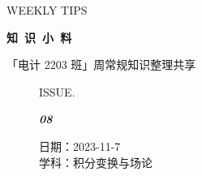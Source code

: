 \documentclass[UTF8]{ctexart}
\newcommand\Black[1]{\textcolor[gray]{0.3}{#1}}
\newcommand\Brown[1]{\textcolor[HTML]{998A4E}{#1}}
\newcommand\IssueNumber{08}
\newcommand\Date{2023-11-7}
\newcommand\Subject{积分变换与场论}
\begin{document}
\BgThispage
\begin{center}
{\scriptsize\Issue \textcolor[HTML]{C8BA83}{WEEKLY TIPS}}

{\Huge\bfseries\TitleFont \Black{知\ 识\ 小\ 料}}

\vspace{-0.1cm}
{\footnotesize \Brown{「电计 2203 班」周常规知识整理共享}}
\end{center}

\vspace{-0.5cm}

\begin{figure}[H]
\hspace{1cm}
\begin{minipage}[t]{0.3\textwidth}
\centering
    \Brown{ISSUE.}

    \vspace{-0.6cm}
    \Huge \Issue\slshape\bfseries\Black{\IssueNumber}
\end{minipage}
\hfill
\begin{minipage}[t]{0.3\textwidth}
\centering
    \Brown{日期：\Date} \\
\vspace{-0.1cm}
    \Brown{学科：\Subject} \\
\end{minipage}
\vspace{-0.2cm}
\end{figure}
\end{document}
